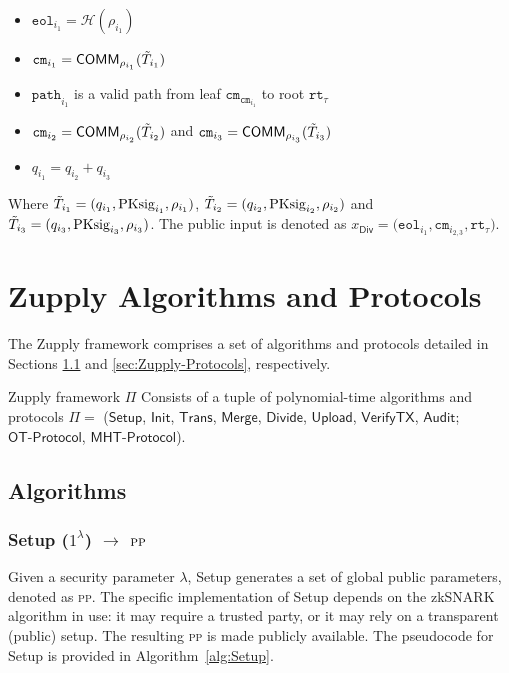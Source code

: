 \begin{itemize}
    \item $\texttt{eol}_{i_1} = \mathcal{H}(\rho_{i_1} )$
	\item $\texttt{cm}_{i_1} = \mathsf{COMM}_{\rho_{i_1}}(\Tilde{T}_{i_1})$
	\item $\texttt{path}_{{i_1}}$ is a valid path from leaf  $\texttt{cm}_{\texttt{cm}_{i_1}}$ to root $\texttt{rt}_\tau$


    \item $\texttt{cm}_{i_2} = \mathsf{COMM}_{\rho_{i_2}}(\Tilde{T}_{i_2})$ and $\texttt{cm}_{i_3} = \mathsf{COMM}_{\rho_{i_3}}(\Tilde{T}_{i_3})$
	\item $q_{i_1} = q_{i_2} + q_{i_3}$
    
\end{itemize}
Where  $\Tilde{T}_{i_1} = (q_{i_1}, \text{PKsig}_{i_1}, \rho_{i_1})$, $\Tilde{T}_{i_2} = (q_{i_2}, \text{PKsig}_{i_2}, \rho_{i_2})$ and $\Tilde{T}_{i_3} = (q_{i_3}, \text{PKsig}_{i_3}, \rho_{i_3})$. The public input is denoted as $x_\mathsf{Div} =\big(\texttt{eol}_{i_1}, \texttt{cm}_{i_{2,3}}, \texttt{rt}_\tau \big)$.

\section{Zupply Algorithms and Protocols}
\label{sec:Zupply Algorithms}
The Zupply framework comprises a set of  algorithms and protocols detailed in Sections \ref{sec:Zupply-Algorithms} and \ref{sec:Zupply-Protocols}, respectively.

\begin{definition}
\label{def:Zupply Framework}
Zupply framework $\Pi$ Consists of a tuple of polynomial-time algorithms and protocols $\Pi = $ ($\textsf{Setup}$, $\textsf{Init}$,  $\textsf{Trans}$, $\textsf{Merge}$, $\textsf{Divide}$, $\textsf{Upload}$, $\textsf{VerifyTX}$, $\textsf{Audit}$; $\textsf{OT-Protocol}$, $\textsf{MHT-Protocol}$).
\end{definition}



\subsection{Algorithms} \label{sec:Zupply-Algorithms}%

\subsubsection{\textsf{Setup} ($1^{\lambda}$) $\rightarrow$ $\textsc{pp}$}
Given a security parameter $\lambda$, \textsf{Setup} generates a set of global public parameters, denoted as \textsc{pp}. The specific implementation of \textsf{Setup} depends on the zkSNARK algorithm in use: it may require a trusted party, or it may rely on a transparent (public) setup. The resulting \textsc{pp} is made publicly available. The pseudocode for \textsf{Setup} is provided in Algorithm~\ref{alg:Setup}.

